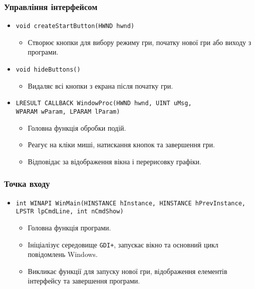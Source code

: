 \documentclass[12pt]{article}
\begin{document}
\subsubsection{Управління інтерфейсом}
\begin{itemize}
    \item \texttt{void createStartButton(HWND hwnd)}
    \begin{itemize}
        \item Створює кнопки для вибору режиму гри, початку нової гри або виходу з програми.
    \end{itemize}
    \item \texttt{void hideButtons()}
    \begin{itemize}
        \item Видаляє всі кнопки з екрана після початку гри.
    \end{itemize}
    \item \texttt{LRESULT CALLBACK WindowProc(HWND hwnd, UINT uMsg, \\
        WPARAM wParam, LPARAM lParam)}
    \begin{itemize}
    
        \item Головна функція обробки подій.
        \item Реагує на кліки миші, натискання кнопок та завершення гри.
        \item Відповідає за відображення вікна і перерисовку графіки.
    \end{itemize}
\end{itemize}

\subsubsection{Точка входу}
\begin{itemize}
    \item \texttt{int WINAPI WinMain(HINSTANCE hInstance, HINSTANCE hPrevInstance,} \\
    \texttt{LPSTR lpCmdLine, int nCmdShow)}
    \begin{itemize}
    
        \item Головна функція програми.
        \item Ініціалізує середовище \texttt{GDI+}, запускає вікно та основний цикл повідомлень Windows.
        \item Викликає функції для запуску нової гри, відображення елементів інтерфейсу та завершення програми.
    \end{itemize}
\end{itemize}
\end{document}
